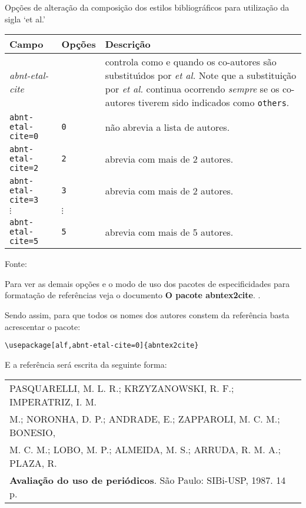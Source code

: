 \begin{quadro}[H]
	\caption{\label{quadro-opcoes-etal}Op\c{c}\~oes de altera\c{c}\~ao da composi\c{c}\~ao dos estilos bibliogr\'aficos para utiliza\c{c}\~ao da sigla ‘et al.’}
		\begin{tabular}{|p{4.0cm}|p{2.0cm}|p{8.5cm}|}
			\hline
			\textbf{Campo} & \textbf{Op\c{c}\~oes} & \textbf{Descri\c{c}\~ao} \\ 
			\hline
			\emph{abnt-etal-cite} &  & controla como e quando os co-autores s\~ao
			substitu\'{\i}dos por \emph{et al.}  Note que a substitui\c{c}\~ao
			por \emph{et al.} continua ocorrendo \emph{sempre} se os co-autores tiverem sido indicados
			como \texttt{others}.\\
			\hline
			\texttt{abnt-etal-cite=0}&\texttt{0}& n\~ao abrevia a lista de autores.\\
			\hline
			\texttt{abnt-etal-cite=2}& \texttt{2} & abrevia com mais de 2 autores.\\
			\hline
			\texttt{abnt-etal-cite=3}& \texttt{3} & abrevia com mais de 2 autores.\\
			\hline
			$\vdots$ & $\vdots$ & \\
			\hline
			\texttt{abnt-etal-cite=5}& \texttt{5} & abrevia com mais de 5 autores.\\
			\hline
		\end{tabular}
	\begin{flushleft}
		Fonte: 
	\end{flushleft}	
\end{quadro}

Para ver as demais op\c{c}\~oes e o modo de uso dos pacotes de especificidades para formata\c{c}\~ao de refer\^encias veja o documento \textbf{O pacote abntex2cite}. \cite{abnetxcite}.

Sendo assim, para que todos os nomes dos autores constem da refer\^encia basta acrescentar o pacote: 

\verb+\usepackage[alf,abnt-etal-cite=0]{abntex2cite}+

E a refer\^encia ser\'a escrita da seguinte forma: \\

\begin{tabular}{|l|c|} \hline
PASQUARELLI, M. L. R.; KRZYZANOWSKI, R. F.; IMPERATRIZ, I. M.\\
M.; NORONHA, D. P.; ANDRADE, E.; ZAPPAROLI, M. C. M.; BONESIO, \\
M. C. M.; LOBO, M. P.; ALMEIDA, M. S.; ARRUDA, R. M. A.; PLAZA, R. \\ \textbf{Avalia\c{c}\~ao do uso de peri\'odicos}. S\~ao Paulo: SIBi-USP, 1987. 14 p.\\\hline
\end{tabular}\\

